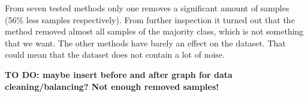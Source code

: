 From seven tested methods only one removes a significant amount of samples (56\% less samples respectively). From further inspection it turned out that the method removed almost all samples of the majority class, which is not something that we want. The other methods have barely an effect on the dataset. That could mean that the dataset does not contain a lot of noise.


\textbf{TO DO: maybe insert before and after graph for data cleaning/balancing? Not enough removed samples!} 
